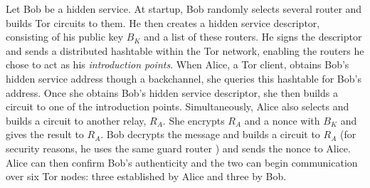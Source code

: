 Let Bob be a hidden service. At startup, Bob randomly selects several router and builds Tor circuits to them. He then creates a hidden service descriptor, consisting of his public key $ B_{K} $ and a list of these routers. He signs the descriptor and sends a distributed hashtable within the Tor network, enabling the routers he chose to act as his \textit{introduction points}. When Alice, a Tor client, obtains Bob's hidden service address though a backchannel, she queries this hashtable for Bob's address. Once she obtains Bob's hidden service descriptor, she then builds a circuit to one of the introduction points. Simultaneously, Alice also selects and builds a circuit to another relay, $ R_{A} $. She encrypts $ R_{A} $ and a nonce with $ B_{K} $ and gives the result to $ R_{A} $. Bob decrypts the message and builds a circuit to $ R_{A} $ (for security reasons, he uses the same guard router \cite{bauer2007low}\cite{overlier2006locating}) and sends the nonce to Alice. Alice can then confirm Bob's authenticity and the two can begin communication over six Tor nodes: three established by Alice and three by Bob.

